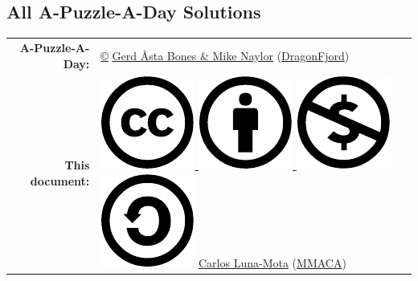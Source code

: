 \documentclass[a4paper, 10pt]{article}
\begin{document}
    \begin{center}
        
        \section*{\Huge All A-Puzzle-A-Day Solutions}
        \bigskip
        
        {\large \begin{tabular}{rl}
         \textbf{A-Puzzle-A-Day:} & \href{https://en.wikipedia.org/wiki/All_rights_reserved}{©} %
            \href{https://www.dragonfjord.com/about-us/}{Gerd Åsta Bones \& Mike Naylor} (\href{https://www.dragonfjord.com/}{DragonFjord}) \\[1ex]
        \textbf{This document:} & \href{https://creativecommons.org/licenses/by-nc-sa/4.0/}{%
            \includegraphics[scale=0.16]{cc.pdf}%
            \includegraphics[scale=0.16]{by.pdf}%
            \includegraphics[scale=0.16]{nc.pdf}%
            \includegraphics[scale=0.16]{sa.pdf}} %
            \href{https://github.com/CarlosLunaMota}{Carlos Luna-Mota} (\href{https://mmaca.cat/}{MMACA})
        \end{tabular}}


\end{center}
\end{document}
